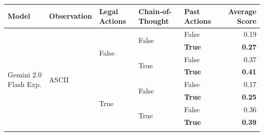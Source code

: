\begin{tabular}{@{}lllllr@{}}
    \toprule
    \textbf{Model}                              & \textbf{Observation}              & \textbf{Legal Actions}    & \textbf{Chain-of-Thought} & \textbf{Past Actions} & \textbf{Average Score} \\
    \midrule
    \multirow[c]{28}{*}{Gemini 2.0 Flash Exp.}  & \multirow[c]{9}{*}{ASCII}         & \multirow[c]{4}{*}{False} & \multirow[c]{2}{*}{False} & False                 & 0.19 \\
                                                &                                   &                           &                           & \textbf{True}         & \textbf{0.27} \\
    \cmidrule{4-6}                                                                                                                                                     
                                                &                                   &                           & \multirow[c]{2}{*}{True}  & False                 & 0.37 \\
                                                &                                   &                           &                           & \textbf{True}         & \textbf{0.41} \\
    \cmidrule{3-6}                                                                                                                                                     
                                                &                                   & \multirow[c]{4}{*}{True}  & \multirow[c]{2}{*}{False} & False                 & 0.17 \\
                                                &                                   &                           &                           & \textbf{True}         & \textbf{0.25} \\
    \cmidrule{4-6}                                                                                                                                                     
                                                &                                   &                           & \multirow[c]{2}{*}{True}  & False                 & 0.36 \\
                                                &                                   &                           &                           & \textbf{True}         & \textbf{0.39} \\
    \cmidrule{2-6}                                                                                                                                                     

\end{tabular}
